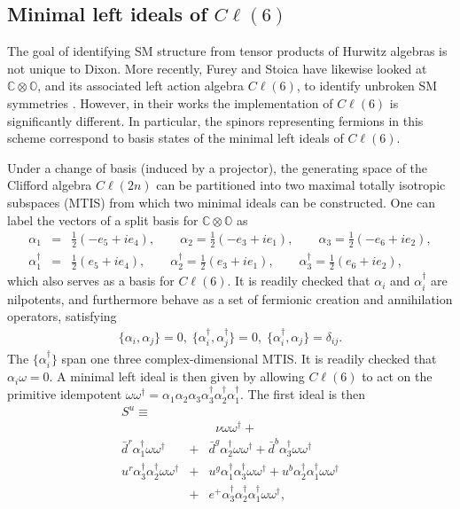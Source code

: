 \documentclass[a4paper]{jpconf}
\begin{document}
\subsection{Minimal left ideals of $C\ell(6)$}

The goal of identifying SM structure from tensor products of Hurwitz algebras is not unique to Dixon. More recently, Furey and Stoica have likewise looked at $\mathbb{C}\otimes\mathbb{O}$, and its associated left action algebra $C\ell(6)$, to identify unbroken SM symmetries \cite{furey2016standard,stoica2018leptons}. However, in their works the implementation of $C\ell(6)$ is significantly different. In particular, the spinors representing fermions in this scheme correspond to basis states of the minimal left ideals of $C\ell(6)$. 

Under a change of basis (induced by a projector), the generating space of the Clifford algebra $C\ell(2n)$ can be partitioned into two maximal totally isotropic subspaces (MTIS) from which two minimal ideals can be constructed. One can label the vectors of a split basis for $\mathbb{C}\otimes\mathbb{O}$ as
\begin{eqnarray}
\alpha_1 &=&\frac{1}{2}(-e_5+ie_4),\qquad \alpha_2=\frac{1}{2}(-e_3+ie_1),\qquad \alpha_3=\frac{1}{2}(-e_6+ie_2),\\
\alpha_1^{\dagger}&=&\frac{1}{2}(e_5+ie_4),\qquad \alpha_2^{\dagger}=\frac{1}{2}(e_3+ie_1),\qquad \alpha_3^{\dagger}=\frac{1}{2}(e_6+ie_2),
\end{eqnarray}
which also serves as a basis for $C\ell(6)$. It is readily checked that $\alpha_i$ and $\alpha_i^{\dagger}$ are nilpotents, and furthermore behave as a set of fermionic creation and annihilation operators, satisfying
\begin{eqnarray}
\lbrace \alpha_i,\alpha_j \rbrace=0,\; \lbrace \alpha_i^{\dagger},\alpha_j^{\dagger} \rbrace=0,\; \lbrace \alpha_i^{\dagger},\alpha_j \rbrace=\delta_{ij}.
\end{eqnarray}
The $\lbrace\alpha^{\dagger}_i\rbrace$ span one three complex-dimensional MTIS. It is readily checked that $\alpha_i\omega=0$. A minimal left ideal is then given by allowing $C\ell(6)$ to act on the primitive idempotent $\omega\omega^{\dagger}=\alpha_1\alpha_2\alpha_3\alpha_3^{\dagger}\alpha_2^{\dagger}\alpha_1^{\dagger}$. The first ideal is then
\begin{eqnarray}\label{ideal}
\nonumber S^u\equiv &{}&\\
\nonumber &{}&\;\;\nu \omega\omega^{\dagger}+\\
\nonumber \bar{d}^r\alpha_1^{\dagger}\omega\omega^{\dagger} &+& \bar{d}^g\alpha_2^{\dagger}\omega\omega^{\dagger} + \bar{d}^b\alpha_3^{\dagger}\omega\omega^{\dagger}\\
\nonumber u^r\alpha_3^{\dagger}\alpha_2^{\dagger}\omega\omega^{\dagger} &+& u^g\alpha_1^{\dagger}\alpha_3^{\dagger}\omega\omega^{\dagger} + u^b\alpha_2^{\dagger}\alpha_1^{\dagger}\omega\omega^{\dagger}\\
&+& e^{+}\alpha_3^{\dagger}\alpha_2^{\dagger}\alpha_1^{\dagger}\omega\omega^{\dagger},
\end{eqnarray}
\end{document}
